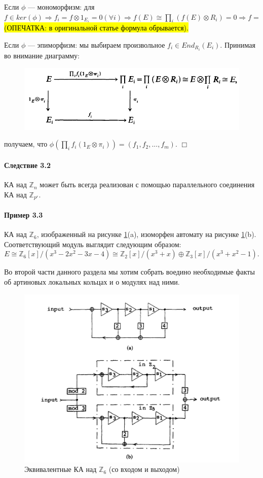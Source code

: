 \documentclass[a4paper,12pt]{article}
\begin{document}
Если $\phi$ --- мономорфизм: для $f \in ker(\phi) \Rightarrow f_i = f \otimes 1_{E_i} = 0 (\forall i) \Rightarrow f(E) \cong \prod_{i}(f(E) \otimes R_i) = 0 \Rightarrow f = $ \hl{(ОПЕЧАТКА: в оригинальной статье формула обрывается).}

Если $\phi$ --- эпиморфизм: мы выбираем произвольное $f_i \in End_{R_i} (E_i)$. Принимая во внимание диаграмму:

\begin{figure}[h]
	\centering
	\includegraphics[width=0.5\linewidth]{pictures/diag_2.png}
\end{figure}

получаем, что $\phi(\prod_i f_i (1_E \otimes \pi_i)) = (f_1, f_2, ..., f_m)$. $\Box$

\paragraph{Следствие 3.2}
КА над $\mathbb{Z}_n$ может быть всегда реализован с помощью параллельного соединения КА над $\mathbb{Z}_{p^r}$.


\paragraph{Пример 3.3}
КА над $\mathbb{Z}_6$, изображенный на рисунке \ref{fig2ab}(a), изоморфен автомату на рисунке \ref{fig2ab}(b). Соответствующий модуль выглядит следующим образом:
$$
E \cong \mathbb{Z}_6 [x] / (x^3 - 2x^2 - 3x - 4) \cong \mathbb{Z}_2 [x] / (x^3 + x) \oplus \mathbb{Z}_3 [x] / (x^3 + x^2 - 1).
$$

Во второй части данного раздела мы хотим собрать воедино необходимые факты об артиновых локальных кольцах и о модулях над ними.

\begin{figure}[h]
	\centering
	\includegraphics[width=0.75\linewidth]{pictures/fig2ab.png}
	\caption{Эквивалентные КА над $\mathbb{Z}_6$ (со входом и выходом)}
	\label{fig2ab}
\end{figure}
\end{document}
